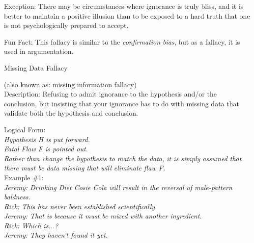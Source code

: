\documentclass[a4paper,12pt,single,pdftex]{scrartcl}
\begin{document}
    
      
    
    
      Exception: There may be circumstances where ignorance is truly bliss, and it is better to maintain a positive illusion than to be exposed to a hard truth that one is not psychologically prepared to accept.
    
    
      
    
    
      Fun Fact: This fallacy is similar to the {\em confirmation bias}, but as a fallacy, it is used in argumentation.
    
  

Missing Data Fallacy
    
      (also known as: missing information fallacy)
    \\

  
    Description: Refusing to admit ignorance to the hypothesis and/or the conclusion, but insisting that your ignorance has to do with missing data that validate both the hypothesis and conclusion.

    
      Logical Form:
    \\

    
      {\em Hypothesis H is put forward.}
    \\

    
      {\em Fatal Flaw F is pointed out.}
    \\

    
      {\em Rather than change the hypothesis to match the data, it is simply assumed that there must be data missing that will eliminate flaw F.}
    \\

    
      Example \#1: 
    \\

    
      {\em Jeremy: Drinking Diet Cosie Cola will result in the reversal of male-pattern baldness.}
    \\

    
      {\em Rick: This has never been established scientifically.}
    \\

    
      {\em Jeremy: That is because it must be mixed with another ingredient.}
    \\

    
      {\em Rick: Which is...?}
    \\

    
      {\em Jeremy: They haven’t found it yet.}
    \\
\end{document}
